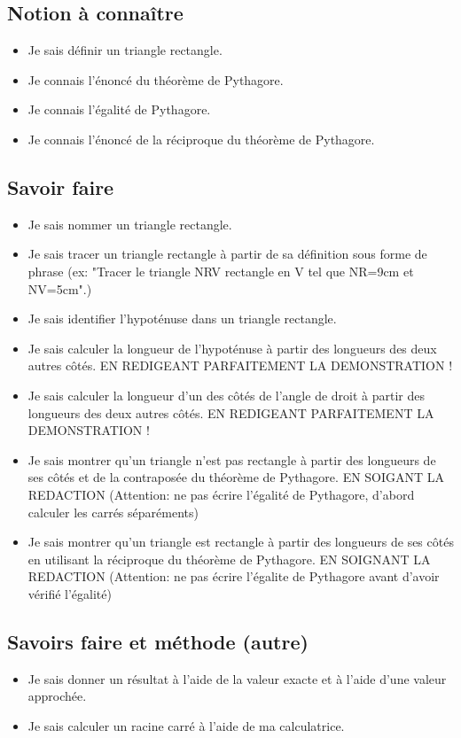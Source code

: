 \documentclass[12pt,a4paper]{article}
\begin{document}
\subsection{Notion à connaître}
\begin{itemize}
    \item Je sais définir un triangle rectangle.
    \item Je connais l'énoncé du théorème de Pythagore.
    \item Je connais l'égalité de Pythagore.
    \item Je connais l'énoncé de la réciproque du théorème de Pythagore.
\end{itemize}

\subsection{Savoir faire}
\begin{itemize}
    \item Je sais nommer un triangle rectangle.
    \item Je sais tracer un triangle rectangle à partir de sa définition sous
        forme de phrase (ex: "Tracer le triangle NRV rectangle en V tel que
        NR=9cm et NV=5cm".)
    \item Je sais identifier l'hypoténuse dans un triangle rectangle.
    \item Je sais calculer la longueur de l'hypoténuse à partir des longueurs
        des deux autres côtés. EN REDIGEANT PARFAITEMENT LA DEMONSTRATION !
    \item Je sais calculer la longueur d'un des côtés de l'angle de droit à
        partir des longueurs des deux autres côtés. EN REDIGEANT PARFAITEMENT LA DEMONSTRATION !
    \item Je sais montrer qu'un triangle n'est pas rectangle à partir des
        longueurs de ses côtés et de la contraposée du théorème de Pythagore. 
        EN SOIGANT LA REDACTION (Attention: ne pas
        écrire l'égalité de Pythagore, d'abord calculer les carrés séparéments)
    \item Je sais montrer qu'un triangle est rectangle à partir des
        longueurs de ses côtés en utilisant la réciproque du théorème de
        Pythagore. EN SOIGNANT LA REDACTION (Attention: ne pas
        écrire l'égalite de Pythagore avant d'avoir vérifié l'égalité)
\end{itemize}

\subsection{Savoirs faire et méthode (autre)}
\begin{itemize}
    \item Je sais donner un résultat à l'aide de la valeur exacte et à l'aide
        d'une valeur approchée.
    \item Je sais calculer un racine carré à l'aide de ma calculatrice.
\end{itemize}
\end{document}
